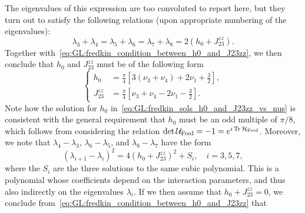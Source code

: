 The eigenvalues of this expression are too convoluted to report here, but they turn out to satisfy the following relations (upon appropriate numbering of the eigenvalues):
\begin{equation}
    \lambda_3 + \lambda_4
    = \lambda_5 + \lambda_6
    = \lambda_7 + \lambda_8 = 2(h_0 + J_{23}^{zz}).
\end{equation}
Together with~\cref{eq:GL:fredkin_condition_between_h0_and_J23zz}, we then conclude that $h_0$ and $J_{23}^{zz}$ must be of the following form
\begin{equation}
\begin{cases}
    h_0 &= \frac{\pi}{4}\left[3(\nu_3+\nu_4) + 2\nu_1+\frac{3}{2}\right], \\
    J_{23}^{zz} &= \frac{\pi}{4}\left[\nu_3+\nu_4 - 2\nu_1-\frac{3}{2}\right].
\end{cases}
\label{eq:GL:fredkin_sols_h0_and_J23zz_vs_nus}
\end{equation}
Note how the solution for $h_0$ in~\cref{eq:GL:fredkin_sols_h0_and_J23zz_vs_nus} is consistent with the general requirement that $h_0$ must be an odd multiple of $\pi/8$, which follows from considering the relation $\det\UFred=-1=e^{i\Tr\HFred}$.
Moreover, we note that $\lambda_4-\lambda_3$, $\lambda_6-\lambda_5$, and $\lambda_8-\lambda_7$ have the form
\begin{equation}
    (\lambda_{i+1}-\lambda_i)^2 =
    4(h_0 + J_{23}^{zz})^2 + S_i,
    \quad i=3,5,7,
\end{equation}
where the $S_i$ are the three solutions to the same cubic polynomial. This is a polynomial whose coefficients depend on the interaction parameters, and thus also indirectly on the eigenvalues $\lambda_i$.
If we then assume that $h_0+J_{23}^{zz}=0$, we conclude from~\cref{eq:GL:fredkin_condition_between_h0_and_J23zz} that
